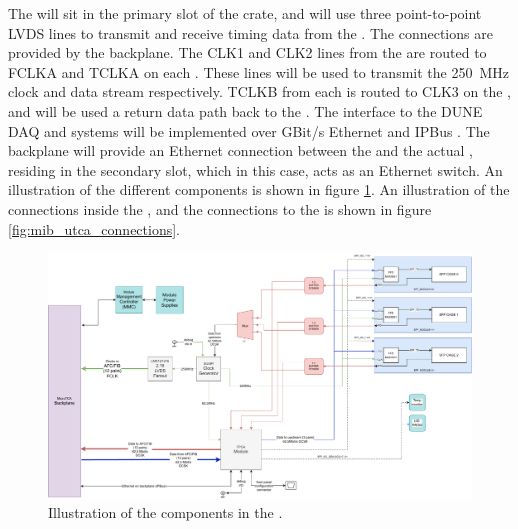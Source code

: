 \documentclass{dune}
\begin{document}
The  will sit in the primary  slot of the  crate, and will use three point-to-point LVDS lines to transmit and receive timing data from the . The connections are provided by the  backplane. The CLK1 and CLK2 lines from the  are routed to FCLKA and TCLKA on each . These lines will be used to transmit the \SI{250}{\MHz} clock and  data stream respectively. TCLKB from each  is routed to CLK3 on the , and will be used a return data path back to the . The interface to the DUNE DAQ and  systems will be implemented over GBit/s Ethernet and IPBus \cite{ipbus}. The  backplane will provide an Ethernet connection between the  and the actual , residing in the secondary  slot, which in this case, acts as an Ethernet switch. An illustration of the different  components is shown in figure \ref{fig:mib_layout}. An illustration of the connections inside the , and the connections to the  is shown in figure \ref{fig:mib_utca_connections}.

\begin{figure}[h]
\includegraphics[width=\textwidth]{dune_mib_v2.drawio.pdf}
\caption{Illustration of the components in the .}
\label{fig:mib_layout}
\end{figure}
\end{document}
